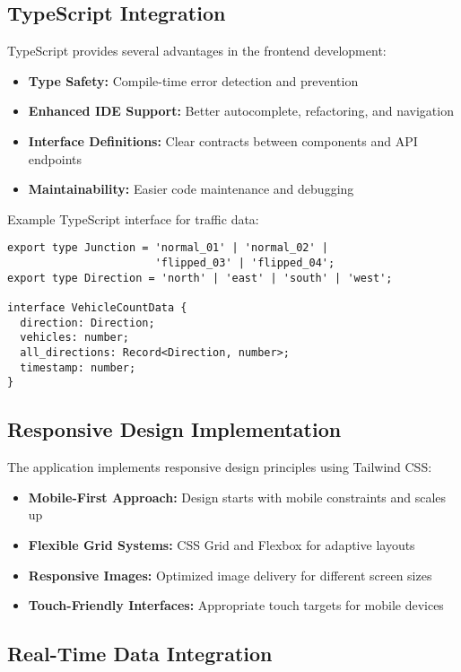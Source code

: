 \documentclass[conference]{IEEEtran}
\begin{document}
\subsection{TypeScript Integration}

TypeScript provides several advantages in the frontend development:
\begin{itemize}
\item \textbf{Type Safety:} Compile-time error detection and prevention
\item \textbf{Enhanced IDE Support:} Better autocomplete, refactoring, and navigation
\item \textbf{Interface Definitions:} Clear contracts between components and API endpoints
\item \textbf{Maintainability:} Easier code maintenance and debugging
\end{itemize}

Example TypeScript interface for traffic data:
\begin{verbatim}
export type Junction = 'normal_01' | 'normal_02' | 
                       'flipped_03' | 'flipped_04';
export type Direction = 'north' | 'east' | 'south' | 'west';

interface VehicleCountData {
  direction: Direction;
  vehicles: number;
  all_directions: Record<Direction, number>;
  timestamp: number;
}
\end{verbatim}

\subsection{Responsive Design Implementation}

The application implements responsive design principles using Tailwind CSS:
\begin{itemize}
\item \textbf{Mobile-First Approach:} Design starts with mobile constraints and scales up
\item \textbf{Flexible Grid Systems:} CSS Grid and Flexbox for adaptive layouts
\item \textbf{Responsive Images:} Optimized image delivery for different screen sizes
\item \textbf{Touch-Friendly Interfaces:} Appropriate touch targets for mobile devices
\end{itemize}

\subsection{Real-Time Data Integration}
\end{document}
